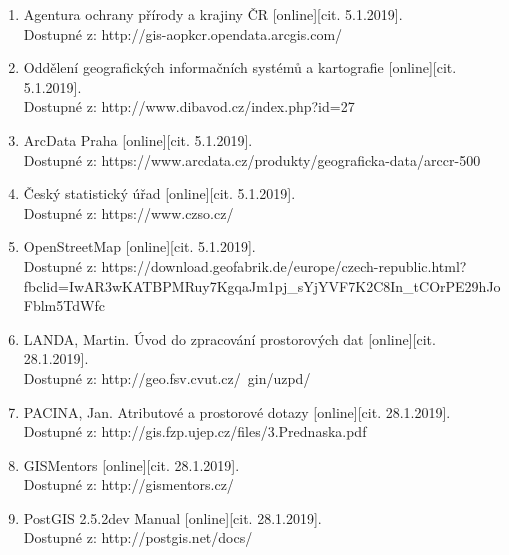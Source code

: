 \documentclass[a4paper, 12pt]{article}
\begin{document}
\begin{enumerate}
\item  Agentura ochrany přírody a krajiny ČR [online][cit. 5.1.2019]. \\
Dostupné z: http://gis-aopkcr.opendata.arcgis.com/  \\

\item  Oddělení geografických informačních systémů a kartografie [online][cit. 5.1.2019]. \\
Dostupné z: http://www.dibavod.cz/index.php?id=27  \\

\item  ArcData Praha [online][cit. 5.1.2019]. \\
Dostupné z: https://www.arcdata.cz/produkty/geograficka-data/arccr-500  \\

\item  Český statistický úřad [online][cit. 5.1.2019]. \\
Dostupné z: https://www.czso.cz/ \\

\item OpenStreetMap [online][cit. 5.1.2019]. \\
Dostupné z: https://download.geofabrik.de/europe/czech-republic.html?fbclid=IwAR3wKATBPMRuy7KgqaJm1pj\_sYjYVF7K2C8In\_tCOrPE29hJoFblm5TdWfc \\

\item LANDA, Martin. Úvod do zpracování prostorových dat [online][cit. 28.1.2019]. \\
Dostupné z: http://geo.fsv.cvut.cz/~gin/uzpd/\\

\item PACINA, Jan. Atributové a prostorové dotazy [online][cit. 28.1.2019]. \\
Dostupné z: http://gis.fzp.ujep.cz/files/3.Prednaska.pdf \\

\item GISMentors [online][cit. 28.1.2019]. \\
Dostupné z: http://gismentors.cz/ \\

\item PostGIS 2.5.2dev Manual [online][cit. 28.1.2019]. \\
Dostupné z: http://postgis.net/docs/ \\

\end{enumerate}
\end{document}
